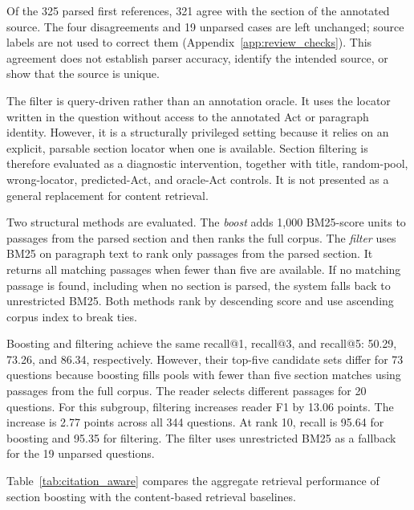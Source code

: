 \documentclass[pdflatex,sn-basic]{sn-jnl}%
\theoremstyle{thmstyleone}%
\theoremstyle{thmstyletwo}%
\theoremstyle{thmstylethree}%
\begin{document}
Of the 325 parsed first references, 321 agree with the section of the
annotated source. The four disagreements and 19 unparsed cases are left
unchanged; source labels are not used to correct them
(Appendix~\ref{app:review_checks}). This agreement does not establish parser
accuracy, identify the intended source, or show that the source is unique.

The filter is query-driven rather than an annotation oracle. It uses the
locator written in the question without access to the annotated Act or
paragraph identity. However, it is a structurally privileged setting because
it relies on an explicit, parsable section locator when one is available.
Section filtering is therefore evaluated as a diagnostic intervention,
together with title, random-pool, wrong-locator, predicted-Act, and oracle-Act
controls. It is not presented as a general replacement for content retrieval.

Two structural methods are evaluated. The \emph{boost} adds 1,000 BM25-score
units to passages from the parsed section and then ranks the full corpus.
The \emph{filter} uses BM25 on paragraph text to rank only passages from the
parsed section. It returns all matching passages when fewer than five are
available. If no matching passage is found, including when no section is
parsed, the system falls back to unrestricted BM25. Both methods rank by
descending score and use ascending corpus index to break ties.

Boosting and filtering achieve the same recall@1, recall@3, and recall@5:
50.29, 73.26, and 86.34, respectively. However, their top-five candidate
sets differ for 73 questions because boosting fills pools with fewer than
five section matches using passages from the full corpus. The reader selects
different passages for 20 questions. For this subgroup, filtering increases
reader F1 by 13.06 points. The increase is 2.77 points across all 344
questions. At rank 10, recall is 95.64 for boosting and 95.35 for filtering.
The filter uses unrestricted BM25 as a fallback for the 19 unparsed
questions.

Table~\ref{tab:citation_aware} compares the aggregate retrieval performance
of section boosting with the content-based retrieval baselines.
\end{document}
